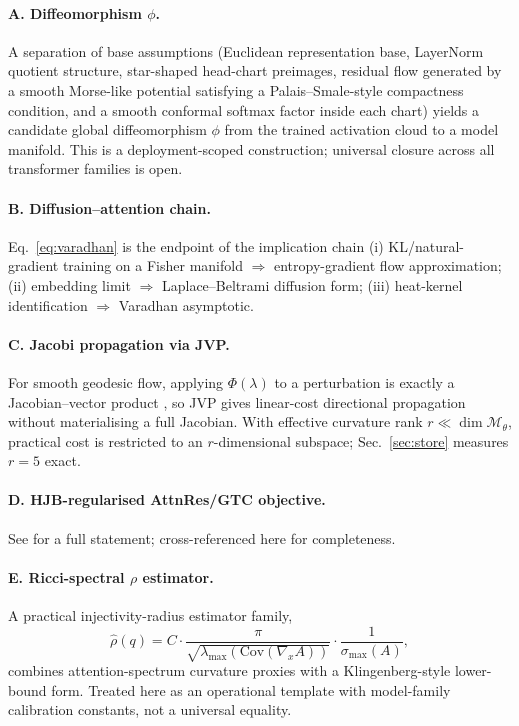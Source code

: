 \documentclass[11pt]{article}
\begin{document}
\paragraph{A. Diffeomorphism $\phi$.} A separation of base assumptions
(Euclidean representation base, LayerNorm quotient structure, star-shaped
head-chart preimages, residual flow generated by a smooth Morse-like potential
satisfying a Palais--Smale-style compactness condition, and a smooth conformal
softmax factor inside each chart) yields a candidate global diffeomorphism
$\phi$ from the trained activation cloud to a model manifold. This is a
deployment-scoped construction; universal closure across all transformer
families is open.

\paragraph{B. Diffusion--attention chain.} Eq.~\eqref{eq:varadhan} is the
endpoint of the implication chain (i) KL/natural-gradient training on a Fisher
manifold $\Rightarrow$ entropy-gradient flow approximation; (ii) embedding
limit $\Rightarrow$ Laplace--Beltrami diffusion form; (iii) heat-kernel
identification $\Rightarrow$ Varadhan asymptotic.

\paragraph{C. Jacobi propagation via JVP.} For smooth geodesic flow, applying
$\Phi(\lambda)$ to a perturbation is exactly a Jacobian--vector product
\cite{pearlmutter1994fast}, so JVP gives linear-cost directional propagation
without materialising a full Jacobian. With effective curvature rank $r\ll\dim
\mathcal{M}_\theta$, practical cost is restricted to an $r$-dimensional
subspace; Sec.~\ref{sec:store} measures $r=5$ exact.

\paragraph{D. HJB-regularised AttnRes/GTC objective.} See
 for a full statement; cross-referenced here for
completeness.

\paragraph{E. Ricci-spectral $\rho$ estimator.} A practical injectivity-radius
estimator family,
\begin{equation}
\hat\rho(q) = C\cdot\frac{\pi}{\sqrt{\lambda_{\max}(\mathrm{Cov}(\nabla_x A))}}\cdot
\frac{1}{\sigma_{\max}(A)},
\end{equation}
combines attention-spectrum curvature proxies with a Klingenberg-style
lower-bound form. Treated here as an operational template with model-family
calibration constants, not a universal equality.
\end{document}
